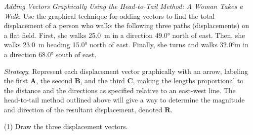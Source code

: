 \documentclass[main-ap-physics.tex]{subfiles}
\begin{document}
\begin{example}
    \textit{Adding Vectors Graphically Using the Head-to-Tail Method: A Woman Takes a Walk}. Use the graphical technique for adding vectors to find the total displacement of a person who walks the following three paths (displacements) on a flat field. First, she walks \SI{25.0}{m} in a direction  \ang{49.0} north of east. Then, she walks \SI{23.0}{m} heading \ang{15.0} north of east. Finally, she turns and walks \ang{32.0}{m} in a direction \ang{68.0} south of east.
\end{example}

\Solution \textit{Strategy}: Represent each displacement vector graphically with an arrow, labeling the first $\textbf{A}$, the second $\textbf{B}$, and the third  $\textbf{C}$, making the lengths proportional to the distance and the directions as specified relative to an east-west line. The head-to-tail method outlined above will give a way to determine the magnitude and direction of the resultant displacement, denoted $\textbf{R}$.

\vspace{1em}

(1) Draw the three displacement vectors.
\end{document}
